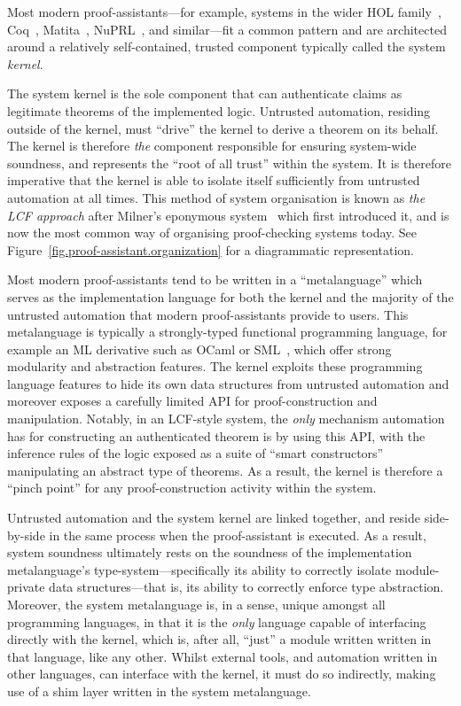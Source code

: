 \documentclass[a4paper, UKenglish, cleveref, autoref, thm-restate, colorlinks]{lipics-v2021}
\begin{document}
Most modern proof-assistants---for example, systems in the wider HOL family~\cite{10.1007/s00165-019-00492-1, DBLP:conf/tphol/Harrison09a, DBLP:conf/tphol/SlindN08}, Coq~\cite{DBLP:conf/popl/HuetH14}, Matita~\cite{DBLP:conf/cade/AspertiRCT11}, NuPRL~\cite{DBLP:conf/cade/AllenCEKL00}, and similar---fit a common pattern and are architected around a relatively self-contained, trusted component typically called the system \emph{kernel}.

The system kernel is the sole component that can authenticate claims as legitimate theorems of the implemented logic.
Untrusted automation, residing outside of the kernel, must ``drive'' the kernel to derive a theorem on its behalf.
The kernel is therefore \emph{the} component responsible for ensuring system-wide soundness, and represents the ``root of all trust'' within the system.
It is therefore imperative that the kernel is able to isolate itself sufficiently from untrusted automation at all times.
This method of system organisation is known as \emph{the LCF approach} after Milner's eponymous system~\cite{DBLP:books/sp/Gordon79} which first introduced it, and is now the most common way of organising proof-checking systems today.
See Figure~\ref{fig.proof-assistant.organization} for a diagrammatic representation.

Most modern proof-assistants tend to be written in a ``metalanguage'' which serves as the implementation language for both the kernel and the majority of the untrusted automation that modern proof-assistants provide to users.
This metalanguage is typically a strongly-typed functional programming language, for example an ML derivative such as OCaml or SML~\cite{DBLP:books/daglib/0069232}, which offer strong modularity and abstraction features.
The kernel exploits these programming language features to hide its own data structures from untrusted automation and moreover exposes a carefully limited API for proof-construction and manipulation.
Notably, in an LCF-style system, the \emph{only} mechanism automation has for constructing an authenticated theorem is by using this API, with the inference rules of the logic exposed as a suite of ``smart constructors'' manipulating an abstract type of theorems.
As a result, the kernel is therefore a ``pinch point'' for any proof-construction activity within the system.

Untrusted automation and the system kernel are linked together, and reside side-by-side in the same process when the proof-assistant is executed.
As a result, system soundness ultimately rests on the soundness of the implementation metalanguage's type-system---specifically its ability to correctly isolate module-private data structures---that is, its ability to correctly enforce type abstraction.
Moreover, the system metalanguage is, in a sense, unique amongst all programming languages, in that it is the \emph{only} language capable of interfacing directly with the kernel, which is, after all, ``just'' a module written written in that language, like any other.
Whilst external tools, and automation written in other languages, can interface with the kernel, it must do so indirectly, making use of a shim layer written in the system metalanguage.
\end{document}
